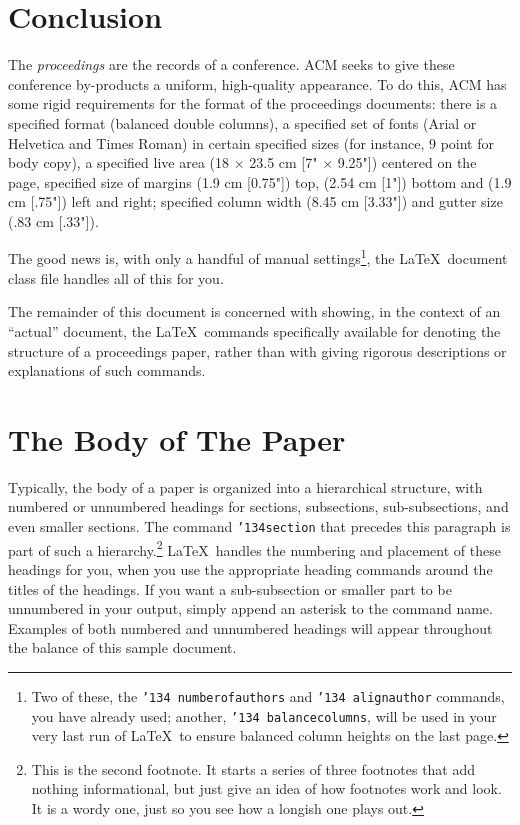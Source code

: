 \documentclass{sig-alternate}
\begin{document}
\section{Conclusion}
The \textit{proceedings} are the records of a conference.
ACM seeks to give these conference by-products a uniform,
high-quality appearance.  To do this, ACM has some rigid
requirements for the format of the proceedings documents: there
is a specified format (balanced  double columns), a specified
set of fonts (Arial or Helvetica and Times Roman) in
certain specified sizes (for instance, 9 point for body copy),
a specified live area (18 $\times$ 23.5 cm [7" $\times$ 9.25"]) centered on
the page, specified size of margins (1.9 cm [0.75"]) top, (2.54 cm [1"]) bottom
and (1.9 cm [.75"]) left and right; specified column width
(8.45 cm [3.33"]) and gutter size (.83 cm [.33"]).

The good news is, with only a handful of manual
settings\footnote{Two of these, the {\texttt{\char'134 numberofauthors}}
and {\texttt{\char'134 alignauthor}} commands, you have
already used; another, {\texttt{\char'134 balancecolumns}}, will
be used in your very last run of \LaTeX\ to ensure
balanced column heights on the last page.}, the \LaTeX\ document
class file handles all of this for you.

The remainder of this document is concerned with showing, in
the context of an ``actual'' document, the \LaTeX\ commands
specifically available for denoting the structure of a
proceedings paper, rather than with giving rigorous descriptions
or explanations of such commands.

\section{The {\secit Body} of The Paper}
Typically, the body of a paper is organized
into a hierarchical structure, with numbered or unnumbered
headings for sections, subsections, sub-subsections, and even
smaller sections.  The command \texttt{{\char'134}section} that
precedes this paragraph is part of such a
hierarchy.\footnote{This is the second footnote.  It
starts a series of three footnotes that add nothing
informational, but just give an idea of how footnotes work
and look. It is a wordy one, just so you see
how a longish one plays out.} \LaTeX\ handles the numbering
and placement of these headings for you, when you use
the appropriate heading commands around the titles
of the headings.  If you want a sub-subsection or
smaller part to be unnumbered in your output, simply append an
asterisk to the command name.  Examples of both
numbered and unnumbered headings will appear throughout the
balance of this sample document.
\end{document}
